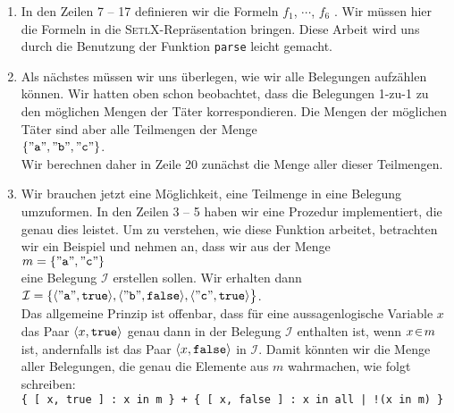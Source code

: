 \begin{enumerate}
\item In den Zeilen 7 -- 17 definieren wir die Formeln $f_1$, $\cdots$, $f_6$      .
      Wir m\"{u}ssen hier die Formeln in die \textsc{SetlX}-Repr\"{a}sentation bringen.
      Diese Arbeit wird uns durch die Benutzung der Funktion \texttt{parse} leicht gemacht.
\item Als n\"{a}chstes m\"{u}ssen wir uns \"{u}berlegen, wie wir alle Belegungen aufz\"{a}hlen k\"{o}nnen. 
      Wir hatten oben schon beobachtet, dass die Belegungen 1-zu-1 zu den m\"{o}glichen Mengen der T\"{a}ter
      korrespondieren.  Die Mengen der m\"{o}glichen T\"{a}ter sind aber alle Teilmengen der Menge
      \\[0.2cm]
      \hspace*{1.3cm}
      $\{ \squote{a}, \squote{b}, \squote{c} \}$. 
      \\[0.2cm]
      Wir berechnen daher in Zeile 20 zun\"{a}chst die Menge aller dieser Teilmengen.
\item Wir brauchen jetzt eine M\"{o}glichkeit, eine Teilmenge in eine Belegung umzuformen.
      In den Zeilen 3 -- 5 haben wir eine Prozedur implementiert, die genau dies
      leistet.  Um zu verstehen, wie diese Funktion arbeitet, betrachten wir ein Beispiel
      und nehmen an, dass wir aus der Menge \\[0.2cm]
      \hspace*{1.3cm} $m = \{\squote{a}, \squote{c} \}$ \\[0.2cm]
      eine Belegung $\mathcal{I}$ erstellen sollen.  Wir erhalten dann \\[0.2cm]
      \hspace*{1.3cm} 
      $\mathcal{I} = \{ \pair(\squote{a},\texttt{true}), 
                        \pair(\squote{b},\texttt{false}),
                        \pair(\squote{c},\texttt{true}) 
       \bigr\}
      $. 
      \\[0.2cm]
      Das allgemeine Prinzip ist offenbar, dass f\"{u}r eine aussagenlogische Variable
      $x$ das Paar $\pair(x,\texttt{true})$ genau dann in der Belegung $\mathcal{I}$
      enthalten ist, wenn $x \!\in\! m$ ist, andernfalls ist das Paar $\pair(x,\texttt{false})$
      in $\mathcal{I}$.  Damit k\"{o}nnten wir die Menge aller Belegungen, die genau die
      Elemente aus $m$ wahrmachen, wie folgt schreiben:
      \\[0.2cm]
      \hspace*{1.3cm}      
      \texttt{\{ [ x, true ] : x in m \} + \{ [ x, false ] : x in all | !(x in m) \}}

\end{enumerate}
